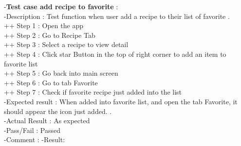 \documentclass{article}
\begin{document}
\newpage 
-\textbf{Test case add recipe to favorite }: \\
    -Description : Test function when user add a recipe to their list of favorite . \\
    ++ Step 1 : Open the app  \\
    ++ Step 2 : Go to Recipe Tab \\
    ++ Step 3 : Select a recipe to view detail   \\
    ++ Step 4 : Click star Button in the top of right corner to add an item to favorite list\\
    ++ Step 5 : Go back into main screen  \\
    ++ Step 6 :  Go to tab Favorite  \\
    ++ Step 7 : Check if favorite recipe just added into the list \\
    -Expected result : When added into favorite list, and open the tab Favorite, it should appear the icon just added. . \\
    -Actual Result : As expected \\
    -Pass/Fail : Passed \\
    -Comment : 
    -Result:
\end{document}
